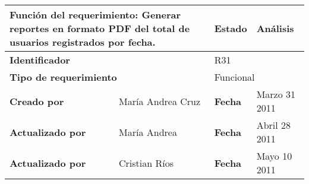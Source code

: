 %
\begin{center}
\begin{longtable}{|p{}|p{}|p{}|p{}|}
\hline
\multicolumn{2}{|p{0.45\textwidth}|}{{\bf {Función del requerimiento:}}
Generar reportes en formato PDF del total de usuarios registrados por fecha. } & {\bf{ Estado}} & Análisis \\
\hline
\multicolumn{2}{|p{0.45\textwidth}}{\bf Identificador} &
\multicolumn{2}{|p{0.45\textwidth}|}{R31} \\
\hline
\multicolumn{2}{|p{0.45\textwidth}}{\bf {Tipo de requerimiento}} &
\multicolumn{2}{|p{0.45\textwidth}|}{Funcional}\\
\hline
\bf {Creado por} & María Andrea Cruz & \bf {Fecha } & Marzo 31 2011 \\
\hline
\bf {Actualizado por} & María Andrea & \bf {Fecha }& Abril 28 2011\\
\hline
\bf {Actualizado por} & Cristian Ríos & \bf {Fecha }& Mayo 10 2011\\


\end{longtable}
\end{center}
